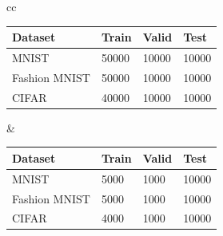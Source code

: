 \documentclass{article}
\begin{document}
\begin{tabular}{cc}
    \begin{minipage}{.5\linewidth}
\centering
\begin{tabular}{@{}llll@{}}
\toprule
\textbf{Dataset} & \textbf{Train} & \textbf{Valid} & \textbf{Test} \\ \midrule
MNIST            & 50000          & 10000          & 10000         \\
Fashion MNIST    & 50000          & 10000          & 10000         \\
CIFAR            & 40000          & 10000          & 10000         \\ \bottomrule
\end{tabular}
\label{tab:my-table}
    \end{minipage} &
    \begin{minipage}{.5\linewidth}
    \centering
    \begin{tabular}{@{}llll@{}}
\toprule
\textbf{Dataset} & \textbf{Train} & \textbf{Valid} & \textbf{Test} \\ \midrule
MNIST            & 5000          & 1000          & 10000         \\
Fashion MNIST    & 5000          & 1000          & 10000         \\
CIFAR            & 4000          & 1000          & 10000         \\ \bottomrule
\end{tabular}
\label{tab:my-table}
    \end{minipage} 
\end{tabular}
\end{document}
